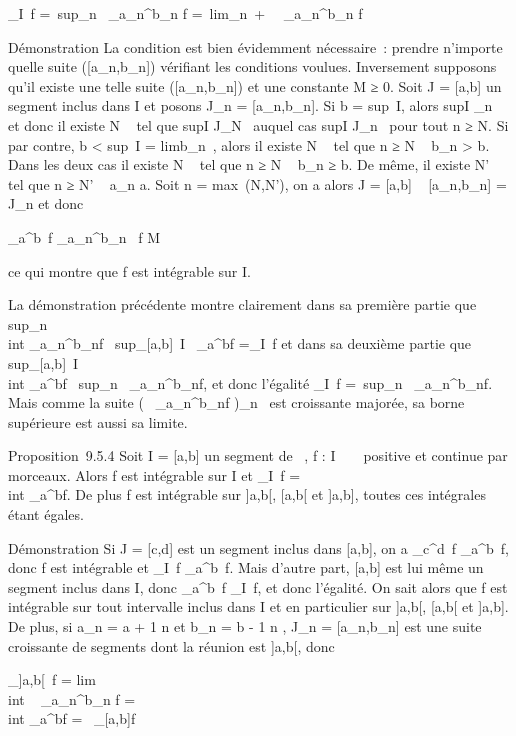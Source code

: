 \documentclass[]{article}
\begin{document}
\int  _I~f =\
sup_n\int ~
_a_n^b_n f =\
lim_n\rightarrow~+\infty~\int ~
_a_n^b_n f

Démonstration La condition est bien évidemment nécessaire~: prendre
n'importe quelle suite ([a_n,b_n]) vérifiant les
conditions voulues. Inversement supposons qu'il existe une telle suite
([a_n,b_n]) et une constante M ≥ 0. Soit J =
[a,b] un segment inclus dans I et posons J_n =
[a_n,b_n]. Si b = sup~I,
alors supI \in\cupJ_n~ et donc il existe N
\in \mathbb{N}~ tel que supI \in J_N~ auquel cas
supI \in J_n~ pour tout n ≥ N. Si par
contre, b < sup~I
= limb_n~, alors il existe N \in {}~ tel
que n ≥ N \rigtharrow~ b_n > b. Dans les deux cas il existe N
\in {}~ tel que n ≥ N \rigtharrow~ b_n ≥ b. De même, il existe N' \in \mathbb{N}~ tel que
n ≥ N' \rigtharrow~ a_n \leq a. Soit n = max~(N,N'),
on a alors J = [a,b] \subset~ [a_n,b_n] =
J_n et donc

\int  _a^b~f
\leq\int  _a_n^b_n~
f \leq M

ce qui montre que f est intégrable sur I.

La démonstration précédente montre clairement dans sa première partie
que sup_n~\\int
 _a_n^b_nf \leq\
sup_[a,b]\subset~I\int ~
_a^bf =\int  _I~f et dans
sa deuxième partie que
sup_[a,b]\subset~I~\\int
 _a^bf \leq\
sup_n\int ~
_a_n^b_nf, et donc l'égalité
\int  _I~f =\
sup_n\int ~
_a_n^b_nf. Mais comme la suite
\left (\int ~
_a_n^b_nf\right
)_n\in{}~ est croissante majorée, sa borne supérieure est aussi sa
limite.

Proposition~9.5.4 Soit I = [a,b] un segment de ~, f : I \rightarrow~ ~ positive
et continue par morceaux. Alors f est intégrable sur I et
\int  _I~f =\\int
 _a^bf. De plus f est intégrable sur ]a,b[,
[a,b[ et ]a,b], toutes ces intégrales étant égales.

Démonstration Si J = [c,d] est un segment inclus dans [a,b], on
a \int  _c^d~f
\leq\int  _a^b~f, donc f est
intégrable et \int  _I~f
\leq\int  _a^b~f. Mais d'autre part,
[a,b] est lui même un segment inclus dans I, donc
\int  _a^b~f
\leq\int  _I~f, et donc l'égalité. On sait
alors que f est intégrable sur tout intervalle inclus dans I et en
particulier sur ]a,b[, [a,b[ et ]a,b]. De plus, si
a_n = a + 1 \over n et b_n = b -
1 \over n , J_n =
[a_n,b_n] est une suite croissante de segments
dont la réunion est ]a,b[, donc

\int  _]a,b[~f
= lim\\int ~
_a_n^b_n f =\\int
 _a^bf =\int ~
_[a,b]f
\end{document}
